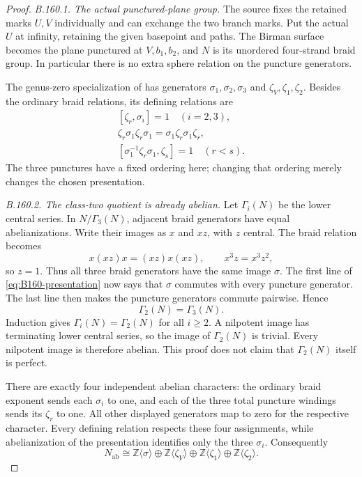 \begin{proof}
\emph{B.160.1. The actual punctured-plane group.}
The source fixes the retained marks \(U,V\) individually and
can exchange the two branch marks. Put the actual \(U\) at
infinity, retaining the given basepoint and paths. The Birman
surface becomes the plane punctured at \(V,b_1,b_2\), and
\(N\) is its unordered four-strand braid group. In particular
there is no extra sphere relation on the puncture generators.

The genus-zero specialization of
\citet[Proposition~3.1]{BBellingeriGodelleGuaschi2017}
has generators \(\sigma_1,\sigma_2,\sigma_3\) and
\(\zeta_V,\zeta_1,\zeta_2\). Besides the ordinary braid
relations, its defining relations are
\begin{equation}\label{eq:B160-presentation}
\begin{gathered}
 [\zeta_r,\sigma_i]=1\quad(i=2,3),\\
 \zeta_r\sigma_1\zeta_r\sigma_1
       =\sigma_1\zeta_r\sigma_1\zeta_r,\\
 [\sigma_1^{-1}\zeta_r\sigma_1,\zeta_s]=1\quad(r<s).
\end{gathered}
\end{equation}
The three punctures have a fixed ordering here; changing that
ordering merely changes the chosen presentation.

\emph{B.160.2. The class-two quotient is already abelian.}
Let \(\Gamma_i(N)\) be the lower central series. In
\(N/\Gamma_3(N)\), adjacent braid generators have equal
abelianizations. Write their images as \(x\) and \(xz\),
with \(z\) central. The braid relation becomes
\[
 x(xz)x=(xz)x(xz),\qquad x^3z=x^3z^2,
\]
so \(z=1\). Thus all three braid generators have the same
image \(\sigma\). The first line of
\eqref{eq:B160-presentation} now says that \(\sigma\)
commutes with every puncture generator. The last line then
makes the puncture generators commute pairwise. Hence
\[
 \Gamma_2(N)=\Gamma_3(N).
\]
Induction gives \(\Gamma_i(N)=\Gamma_2(N)\) for all
\(i\geq2\). A nilpotent image has terminating lower central
series, so the image of \(\Gamma_2(N)\) is trivial. Every
nilpotent image is therefore abelian. This proof does not
claim that \(\Gamma_2(N)\) itself is perfect.

There are exactly four independent abelian characters: the
ordinary braid exponent sends each \(\sigma_i\) to one,
and each of the three total puncture windings sends its
\(\zeta_r\) to one. All other displayed generators map to
zero for the respective character. Every defining relation
respects these four assignments, while abelianization of the
presentation identifies only the three \(\sigma_i\).
Consequently
\[
 N_{\mathrm{ab}}\cong
 \mathbb Z\langle\sigma\rangle\oplus
 \mathbb Z\langle\zeta_V\rangle\oplus
 \mathbb Z\langle\zeta_1\rangle\oplus
 \mathbb Z\langle\zeta_2\rangle.
\]


\end{proof}
